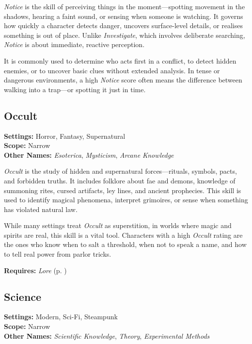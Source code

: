 \emph{Notice} is the skill of perceiving things in the moment—spotting movement in the shadows, hearing a faint sound, or sensing when someone is watching. It governs how quickly a character detects danger, uncovers surface-level details, or realises something is out of place. Unlike \emph{Investigate}, which involves deliberate searching, \emph{Notice} is about immediate, reactive perception.

It is commonly used to determine who acts first in a conflict, to detect hidden enemies, or to uncover basic clues without extended analysis. In tense or dangerous environments, a high \emph{Notice} score often means the difference between walking into a trap—or spotting it just in time.

\subsection{Occult}\label{skill:occult}
\textbf{Settings:} Horror, Fantasy, Supernatural\\
\textbf{Scope:} Narrow\\
\textbf{Other Names:} \emph{Esoterica}, \emph{Mysticism}, \emph{Arcane Knowledge}\\
\vspace{\baselineskip}

\emph{Occult} is the study of hidden and supernatural forces—rituals, symbols, pacts, and forbidden truths. It includes folklore about fae and demons, knowledge of summoning rites, cursed artifacts, ley lines, and ancient prophecies. This skill is used to identify magical phenomena, interpret grimoires, or sense when something has violated natural law.

While many settings treat \emph{Occult} as superstition, in worlds where magic and spirits are real, this skill is a vital tool. Characters with a high \emph{Occult} rating are the ones who know when to salt a threshold, when not to speak a name, and how to tell real power from parlor tricks.

\vspace{0.5\baselineskip}
\noindent\textbf{Requires:} \emph{Lore} (p. \pageref{skill:lore})

\subsection{Science}\label{skill:science}
\textbf{Settings:} Modern, Sci-Fi, Steampunk\\
\textbf{Scope:} Narrow\\
\textbf{Other Names:} \emph{Scientific Knowledge}, \emph{Theory}, \emph{Experimental Methods}\\
\vspace{\baselineskip}

